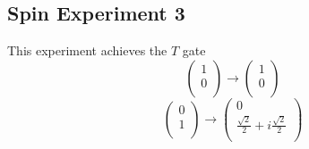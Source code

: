 \documentclass[letterpaper, 12pt]{article}
\begin{document}
  \subsection{Spin Experiment 3}
  This experiment achieves the $T$ gate
  \[
    \begin{pmatrix}
      1\\
      0\\
    \end{pmatrix}
    \rightarrow
    \begin{pmatrix}
      1\\
      0\\
    \end{pmatrix}
   \]
   \[
    \begin{pmatrix}
      0\\
      1\\
    \end{pmatrix}
    \rightarrow
    \begin{pmatrix}
      0\\
      \frac{\sqrt{2}}{2} + i\frac{\sqrt{2}}{2}\\
    \end{pmatrix}
  \]



\end{document}
